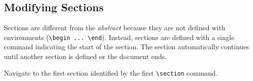     \begin{minipage}{\linewidth}
        \centering
        \label{fig:Preamble}
    \end{minipage}
 
    \subsection{Modifying Sections}
    Sections are different from the \textit{abstract} because they are not defined with environments (\verb|\begin ... \end|). Instead, sections are defined with a single command indicating the start of the section. The section automatically continues until another section is defined or the document ends.
    \par
    Navigate to the first section identified by the first \verb|\section| command.
    \begin{minipage}{\linewidth}
        \centering
        \label{fig:Preamble}
    \end{minipage}
    
    